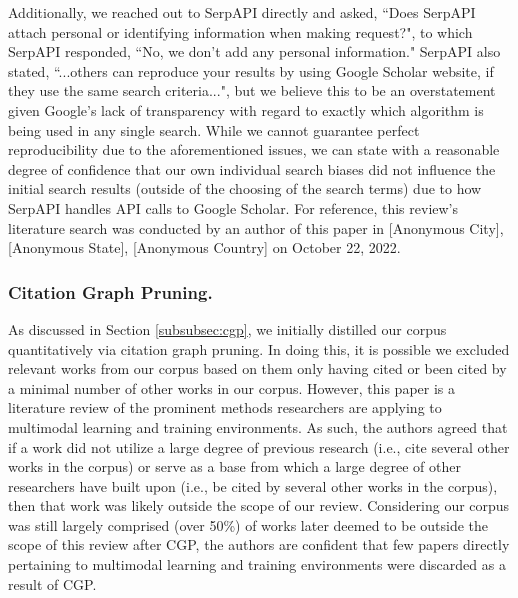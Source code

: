 \documentclass[manuscript,screen,review]{acmart}
\begin{document}
Additionally, we reached out to SerpAPI directly and asked, ``Does SerpAPI attach personal or identifying information when making request?", to which SerpAPI responded, ``No, we don't add any personal information." SerpAPI also stated, ``...others can reproduce your results by using Google Scholar website, if they use the same search criteria...", but we believe this to be an overstatement given Google's lack of transparency with regard to exactly which algorithm is being used in any single search. While we cannot guarantee perfect reproducibility due to the aforementioned issues, we can state with a reasonable degree of confidence that our own individual search biases did not influence the initial search results (outside of the choosing of the search terms) due to how SerpAPI handles API calls to Google Scholar. For reference, this review's literature search was conducted by an author of this paper in [Anonymous City], [Anonymous State], [Anonymous Country] on October 22, 2022.

\subsubsection{Citation Graph Pruning.} 

As discussed in Section \ref{subsubsec:cgp}, we initially distilled our corpus quantitatively via citation graph pruning. In doing this, it is possible we excluded relevant works from our corpus based on them only having cited or been cited by a minimal number of other works in our corpus. However, this paper is a literature review of the prominent methods researchers are applying to multimodal learning and training environments. As such, the authors agreed that if a work did not utilize a large degree of previous research (i.e., cite several other works in the corpus) or serve as a base from which a large degree of other researchers have built upon (i.e., be cited by several other works in the corpus), then that work was likely outside the scope of our review. Considering our corpus was still largely comprised (over 50\%) of works later deemed to be outside the scope of this review after CGP, the authors are confident that few papers directly pertaining to multimodal learning and training environments were discarded as a result of CGP.
\end{document}
